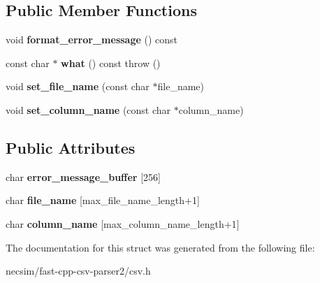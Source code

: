 \subsection*{Public Member Functions}
\begin{DoxyCompactItemize}
\item 
void {\bfseries format\+\_\+error\+\_\+message} () const \hypertarget{structio_1_1error_1_1missing__column__in__header_acd0f4c75f6ffa54c5f9db8867bd4c8d4}{}\label{structio_1_1error_1_1missing__column__in__header_acd0f4c75f6ffa54c5f9db8867bd4c8d4}

\item 
const char $\ast$ {\bfseries what} () const   throw ()\hypertarget{structio_1_1error_1_1base_ad99d4a2459e51ce2c24707569c4a0df6}{}\label{structio_1_1error_1_1base_ad99d4a2459e51ce2c24707569c4a0df6}

\item 
void {\bfseries set\+\_\+file\+\_\+name} (const char $\ast$file\+\_\+name)\hypertarget{structio_1_1error_1_1with__file__name_ae765de62778c989d4658b4efe2995390}{}\label{structio_1_1error_1_1with__file__name_ae765de62778c989d4658b4efe2995390}

\item 
void {\bfseries set\+\_\+column\+\_\+name} (const char $\ast$column\+\_\+name)\hypertarget{structio_1_1error_1_1with__column__name_a2a8144d3591a4bb618368ca7261befef}{}\label{structio_1_1error_1_1with__column__name_a2a8144d3591a4bb618368ca7261befef}

\end{DoxyCompactItemize}
\subsection*{Public Attributes}
\begin{DoxyCompactItemize}
\item 
char {\bfseries error\+\_\+message\+\_\+buffer} \mbox{[}256\mbox{]}\hypertarget{structio_1_1error_1_1base_a8e38f86a7afea1f0c6e6cac0c548d6f2}{}\label{structio_1_1error_1_1base_a8e38f86a7afea1f0c6e6cac0c548d6f2}

\item 
char {\bfseries file\+\_\+name} \mbox{[}max\+\_\+file\+\_\+name\+\_\+length+1\mbox{]}\hypertarget{structio_1_1error_1_1with__file__name_ac957d5590a8b95517b74eb5bf373a424}{}\label{structio_1_1error_1_1with__file__name_ac957d5590a8b95517b74eb5bf373a424}

\item 
char {\bfseries column\+\_\+name} \mbox{[}max\+\_\+column\+\_\+name\+\_\+length+1\mbox{]}\hypertarget{structio_1_1error_1_1with__column__name_af40ba00f1f035d363b099baf1f724323}{}\label{structio_1_1error_1_1with__column__name_af40ba00f1f035d363b099baf1f724323}

\end{DoxyCompactItemize}


The documentation for this struct was generated from the following file\+:\begin{DoxyCompactItemize}
\item 
necsim/fast-\/cpp-\/csv-\/parser2/csv.\+h\end{DoxyCompactItemize}
